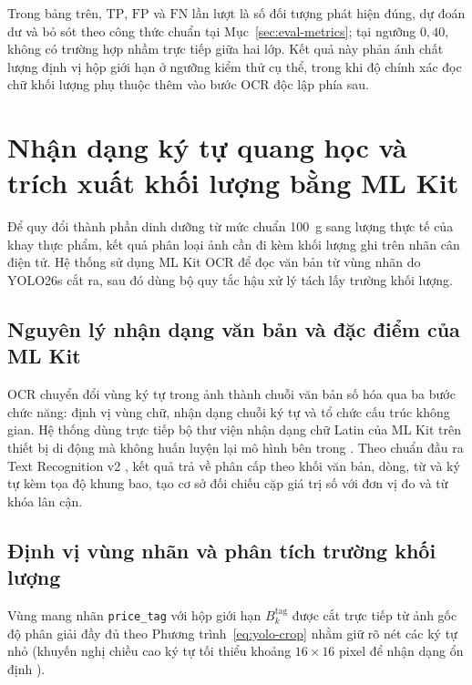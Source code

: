 Trong bảng trên, $\mathrm{TP}$, $\mathrm{FP}$ và $\mathrm{FN}$ lần lượt là số đối tượng phát hiện đúng, dự đoán dư và bỏ sót theo công thức chuẩn tại Mục~\ref{sec:eval-metrics}; tại ngưỡng $0{,}40$, không có trường hợp nhầm trực tiếp giữa hai lớp. Kết quả này phản ánh chất lượng định vị hộp giới hạn ở ngưỡng kiểm thử cụ thể, trong khi độ chính xác đọc chữ khối lượng phụ thuộc thêm vào bước OCR độc lập phía sau.

\section{Nhận dạng ký tự quang học và trích xuất khối lượng bằng ML Kit}
\label{sec:mlkit-ocr}

Để quy đổi thành phần dinh dưỡng từ mức chuẩn 100~g sang lượng thực tế của khay thực phẩm, kết quả phân loại ảnh cần đi kèm khối lượng ghi trên nhãn cân điện tử. Hệ thống sử dụng ML Kit OCR để đọc văn bản từ vùng nhãn do YOLO26s cắt ra, sau đó dùng bộ quy tắc hậu xử lý tách lấy trường khối lượng.

\subsection{Nguyên lý nhận dạng văn bản và đặc điểm của ML Kit}
\label{subsec:mlkit-text-recognition}

OCR chuyển đổi vùng ký tự trong ảnh thành chuỗi văn bản số hóa qua ba bước chức năng: định vị vùng chữ, nhận dạng chuỗi ký tự và tổ chức cấu trúc không gian. Hệ thống dùng trực tiếp bộ thư viện nhận dạng chữ Latin của ML Kit trên thiết bị di động mà không huấn luyện lại mô hình bên trong \cite{googleMlKitOverview}. Theo chuẩn đầu ra Text Recognition v2 \cite{googleMlKitTextV2}, kết quả trả về phân cấp theo khối văn bản, dòng, từ và ký tự kèm tọa độ khung bao, tạo cơ sở đối chiếu cặp giá trị số với đơn vị đo và từ khóa lân cận.

\subsection{Định vị vùng nhãn và phân tích trường khối lượng}
\label{subsec:ocr-label-roi}

Vùng mang nhãn \texttt{price\_tag} với hộp giới hạn $B_k^{\mathrm{tag}}$ được cắt trực tiếp từ ảnh gốc độ phân giải đầy đủ theo Phương trình~\eqref{eq:yolo-crop} nhằm giữ rõ nét các ký tự nhỏ (khuyến nghị chiều cao ký tự tối thiểu khoảng $16\times 16$ pixel để nhận dạng ổn định \cite{googleMlKitTextAndroid}).

